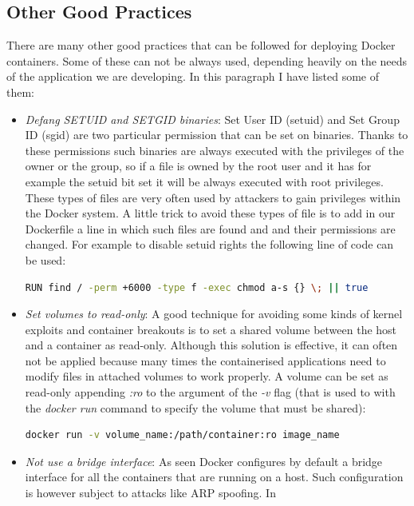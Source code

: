 \documentclass[a4paper,12pt]{article}
\begin{document}
\subsection{Other Good Practices}

There are many other good practices that can be followed for deploying Docker
containers. Some of these can not be always used, depending heavily on the needs
of the application we are developing. In this paragraph I have listed some of
them:
\begin{itemize}
  \item \textit{Defang SETUID and SETGID binaries}: Set User ID (setuid) and
  Set Group ID (sgid) are two particular permission that can be set on binaries.
  Thanks to these permissions such binaries are always executed with the
  privileges of the owner or the group, so if a file is owned by the root user
  and it has for example the setuid bit set it will be always executed with root
  privileges. These types of files are very often used by attackers to gain
  privileges within the Docker system. A little trick to avoid these types of
  file is to add in our Dockerfile a line in which such files are found and and
  their permissions are changed. For example to disable setuid rights the
  following line of code can be used:
  \begin{lstlisting}[language=bash,breaklines]
    RUN find / -perm +6000 -type f -exec chmod a-s {} \; || true
  \end{lstlisting}
  \item \textit{Set volumes to read-only}: A good technique for avoiding some
  kinds of kernel exploits and container breakouts is to set a shared volume
  between the host and a container as read-only. Although this solution is
  effective, it can often not be applied because many times the containerised
  applications need to modify files in attached volumes to work properly. A
  volume can be set as read-only appending \textit{:ro} to the argument of the
  \textit{-v} flag (that is used to with the \textit{docker run} command to
  specify the volume that must be shared): 
  \begin{lstlisting}[language=bash,breaklines]
    docker run -v volume_name:/path/container:ro image_name
  \end{lstlisting}
  \item \textit{Not use a bridge interface}: As seen Docker configures by
  default a bridge interface for all the containers that are running on a host.
  Such configuration is however subject to attacks like ARP spoofing. In

\end{itemize}
\end{document}
